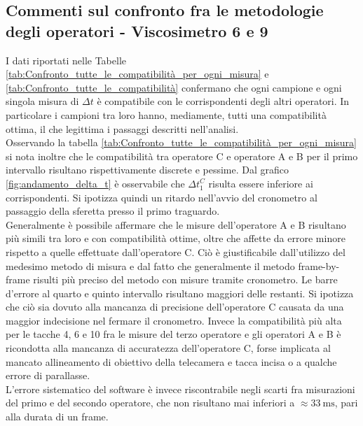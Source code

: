 \documentclass[a4paper,11pt,oneside]{article}
\begin{document}
\subsection{Commenti sul confronto fra  le metodologie degli operatori - Viscosimetro 6 e 9}
I dati riportati nelle Tabelle \ref{tab:Confronto_tutte_le_compatibilità_per_ogni_misura} e  \ref{tab:Confronto_tutte_le_compatibilità} confermano che ogni campione e ogni singola misura di $\Delta t$ è compatibile con le corrispondenti degli altri operatori. In particolare i campioni tra loro hanno, mediamente, tutti una compatibilità ottima, il che legittima i passaggi descritti nell'analisi.\\
Osservando la tabella \ref{tab:Confronto_tutte_le_compatibilità_per_ogni_misura} si nota inoltre che le compatibilità tra operatore C e operatore A e B per il primo intervallo risultano rispettivamente discrete e pessime. Dal grafico \ref{fig:andamento_delta_t} è osservabile che $\Delta t^C_1$ risulta essere inferiore ai corrispondenti. Si ipotizza quindi un ritardo nell'avvio del cronometro al passaggio della sferetta presso il primo traguardo.\\
Generalmente è possibile affermare che le misure dell'operatore A e B risultano più simili tra loro e con compatibilità ottime, oltre che affette da errore minore rispetto a quelle effettuate dall'operatore C. Ciò è giustificabile dall'utilizzo del medesimo metodo di misura e dal fatto che generalmente il metodo frame-by-frame risulti più preciso del metodo con misure tramite cronometro.\newline
Le barre d'errore al quarto e quinto intervallo risultano maggiori delle restanti. Si ipotizza che ciò sia dovuto alla mancanza di precisione dell'operatore C causata da una maggior indecisione nel fermare il cronometro. Invece la compatibilità più alta per le tacche 4, 6 e 10 fra le misure del terzo operatore e gli operatori A e B è ricondotta alla mancanza di accuratezza dell'operatore C, forse implicata al mancato allineamento di obiettivo della telecamera e tacca incisa o a qualche errore di parallasse.\\
L'errore sistematico del software è invece riscontrabile negli scarti fra misurazioni del primo e del secondo operatore, che non risultano mai inferiori a $\approx \SI{33}{\milli\second}$, pari alla durata di un frame.\\
\end{document}
